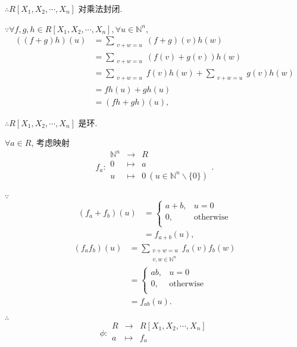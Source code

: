 \documentclass[UTF8]{ctexart}
\begin{document}
$\therefore R[X_1,X_2,\cdots,X_n]$ 对乘法封闭.

$\because\forall f,g,h\in R[X_1,X_2,\cdots,X_n],\forall u\in\mathbb{N}^n$,
\begin{align*}
    ((f+g)h)(u) & =\sum\limits_{\substack{v+w=u}}(f+g)(v)h(w) \\
    & =\sum\limits_{\substack{v+w=u}}(f(v)+g(v))h(w) \\
    & =\sum\limits_{\substack{v+w=u}}f(v)h(w)+\sum\limits_{\substack{v+w=u}}g(v)h(w) \\
    & =fh(u)+gh(u) \\
    & =(fh+gh)(u),
\end{align*}

$\therefore R[X_1,X_2,\cdots,X_n]$ 是环.

$\forall a\in R$, 考虑映射
\[f_a:\begin{array}{rcl}
    \mathbb{N}^n & \to & R \\
    0 & \mapsto & a \\
    u & \mapsto & 0\ (u\in\mathbb{N}^n\backslash\{0\}) \\
\end{array}.\]

$\because$
\begin{align*}
    (f_a+f_b)(u) & =\begin{cases}
                        a+b, & u=0 \\
                        0, & \text{otherwise} \\
                    \end{cases} \\
    & =f_{a+b}(u),
\end{align*}
\begin{align*}
    (f_af_b)(u) & =\sum\limits_{\substack{v+w=u\\v,w\in\mathbb{N}^n}}f_a(v)f_b(w) \\
    & =\begin{cases}
            ab, & u=0 \\
            0, & \text{otherwise} \\
        \end{cases} \\
    & =f_{ab}(u).
\end{align*}

$\therefore$
\[\phi:\begin{array}{rcl}
    R & \to & R[X_1,X_2,\cdots,X_n] \\
    a & \mapsto & f_a \\
\end{array}\]
\end{document}

